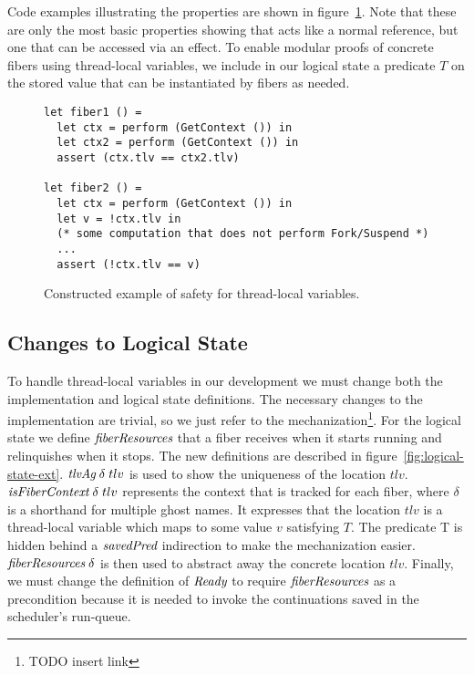 Code examples illustrating the properties are shown in figure~\ref{fig:tlv-example}.
Note that these are only the most basic properties showing that  acts like a normal reference, but one that can be accessed via an effect.
To enable modular proofs of concrete fibers using thread-local variables, we include in our logical state a predicate \(T\) on the stored value that can be instantiated by fibers as needed.

\begin{figure}
  \begin{verbatim}
let fiber1 () =
  let ctx = perform (GetContext ()) in
  let ctx2 = perform (GetContext ()) in
  assert (ctx.tlv == ctx2.tlv)

let fiber2 () =
  let ctx = perform (GetContext ()) in
  let v = !ctx.tlv in
  (* some computation that does not perform Fork/Suspend *)
  ...
  assert (!ctx.tlv == v)
  \end{verbatim}
  \caption{Constructed example of safety for thread-local variables.}
  \label{fig:tlv-example}
\end{figure}

\subsection{Changes to Logical State}

To handle thread-local variables in our development we must change both the implementation and logical state definitions.
The necessary changes to the implementation are trivial, so we just refer to the mechanization\footnote{TODO insert link}.
For the logical state we define \(\emph{fiberResources}{}\) that a fiber receives when it starts running and relinquishes when it stops.
The new definitions are described in figure~\ref{fig:logical-state-ext}.
\(\emph{tlvAg}{}\; \delta\; tlv\) is used to show the uniqueness of the location \(tlv\).
\(\emph{isFiberContext}{}\; \delta\; tlv\) represents the context that is tracked for each fiber, where \(\delta\) is a shorthand for multiple ghost names.
It expresses that the location \(tlv\) is a thread-local variable which maps to some value \(v\) satisfying \(T\).
The predicate T is hidden behind a \(\emph{savedPred}{}\) indirection to make the mechanization easier.
\(\emph{fiberResources}{}\; \delta\) is then used to abstract away the concrete location \(tlv\).
Finally, we must change the definition of \(\emph{Ready}{}\) to require \(\emph{fiberResources}{}\) as a precondition because it is needed to invoke the continuations saved in the scheduler's run-queue.

